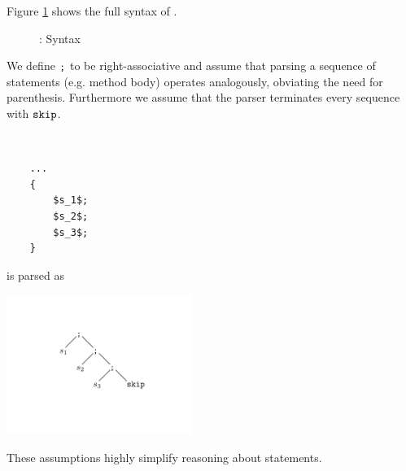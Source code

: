 Figure \ref{fig:idf-syntax} shows the full syntax of \svlidf.
\begin{figure}[h]
    
    \caption{\svlidf: Syntax}
    \label{fig:idf-syntax}
\end{figure}

We define $\textup{\texttt{;}}$ to be right-associative and assume that parsing a sequence of statements (e.g. method body) operates analogously, obviating the need for parenthesis.
Furthermore we assume that the parser terminates every sequence with $\textup{\texttt{skip}}$.
\begin{exmp}~
    \begin{lstlisting}
    ...
    {
        $s_1$;
        $s_2$;
        $s_3$;
    }
    \end{lstlisting}
    is parsed as
    
    \includegraphics[trim={3cm 3cm 3cm 3cm}, clip, width=6cm]{graphics/rightAssocSkip}
\end{exmp}
These assumptions highly simplify reasoning about statements.
